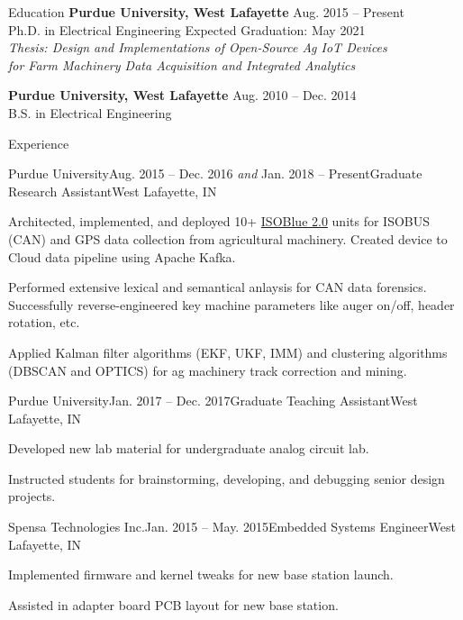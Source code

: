\documentclass{resume}
\begin{document}
  \begin{rSection}{Education}
    {\bf Purdue University, West Lafayette} \hfill {Aug. 2015 -- Present}
    \\ 
    {Ph.D. in Electrical Engineering} \hfill {Expected Graduation: May 2021} \\
    \textit{Thesis: Design and Implementations of Open-Source Ag IoT Devices \\
      for Farm Machinery Data Acquisition and Integrated Analytics}

    {\bf Purdue University, West Lafayette} \hfill {Aug. 2010 -- Dec. 2014}
    \\ 
    {B.S. in Electrical Engineering} \\
  \end{rSection}

  \begin{rSection}{Experience}
    \begin{rSubsection}{Purdue University}{Aug. 2015 -- Dec. 2016 \textit{and}
        Jan. 2018 -- Present}{Graduate Research Assistant}{West Lafayette, IN}
      \item Architected, implemented, and deployed 10+
        \href{https://www.isoblue.org/}{ISOBlue 2.0} units for ISOBUS (CAN) and
        GPS data collection from agricultural machinery. Created device to
        Cloud data pipeline using Apache Kafka.
      \item Performed extensive lexical and semantical anlaysis for CAN data
        forensics. Successfully reverse-engineered key machine parameters like
        auger on/off, header rotation, etc. 
      \item Applied Kalman filter algorithms (EKF, UKF, IMM) and clustering
        algorithms (DBSCAN and OPTICS) for ag machinery track correction and
        mining. 
    \end{rSubsection}

    \begin{rSubsection}{Purdue University}{Jan. 2017 --
        Dec. 2017}{Graduate Teaching Assistant}{West Lafayette, IN}
      \item Developed new lab material for undergraduate analog circuit lab.
      \item Instructed students for brainstorming, developing, and debugging
        senior design projects. 
    \end{rSubsection}

    \begin{rSubsection}{Spensa Technologies Inc.}{Jan. 2015 --
        May. 2015}{Embedded Systems Engineer}{West Lafayette, IN}
      \item Implemented firmware and kernel tweaks for new base station launch.
      \item Assisted in adapter board PCB layout for new base station. 
    \end{rSubsection}


\end{rSection}
\end{document}
